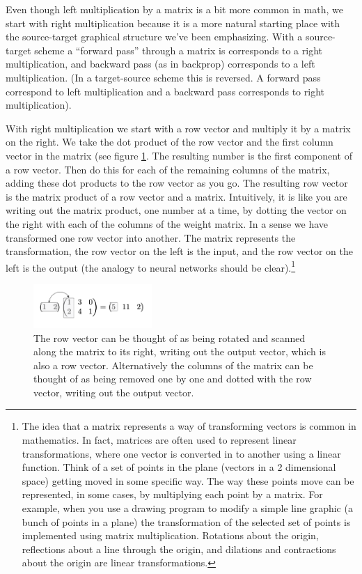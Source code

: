 Even though left multiplication by a matrix is a bit more common in math, we start with right multiplication because it is a more natural starting place with the source-target graphical structure we've been emphasizing.  With a source-target scheme a  ``forward pass'' through a matrix is corresponds to a right multiplication, and backward pass (as in backprop) corresponds to a left multiplication. (In a target-source scheme this is reversed. A forward pass correspond to left multiplication and a backward pass corresponds to right multiplication).

With right multiplication we start with a row vector and multiply it by a matrix on the right. We take the dot product of the row vector and the first column vector in the matrix (see figure \ref{vectorMatrixProduct}. The resulting number is the first component of a row vector. Then do this for each of the remaining columns of the matrix, adding these dot products to the row vector as you go. The resulting row vector is the matrix product of a row vector and a matrix. Intuitively, it is like you are writing out the matrix product, one number at a time, by dotting the vector on the right with each of the columns of the weight matrix.  In a sense we have transformed one row vector into another. The matrix represents the transformation, the row vector on the left is the input, and the row vector on the left is the output (the analogy to neural networks should be clear).\footnote{The idea that a matrix represents a way of transforming vectors is common in mathematics. In fact, matrices are often used to represent linear transformations, where one vector is converted in to another using a linear function. Think of a set of points in the plane (vectors in a 2 dimensional space) getting moved in some specific way. The way these points move can be represented, in some cases, by multiplying each point by a matrix. For example, when you use a drawing program to modify a simple line graphic (a bunch of points in a plane) the transformation of the selected set of points is implemented using matrix multiplication. Rotations about the origin, reflections about a line through the origin, and dilations and contractions about the origin are linear transformations.}

\begin{figure}[h]
\centering
\includegraphics[width=0.4\textwidth]{images/vectorMatrixProduct.png}
\caption[Jeff Yoshimi.]{The row vector can be thought of as being rotated and scanned along the matrix to its right, writing out the output vector, which is also a row vector. Alternatively the columns of the matrix can be thought of as being removed one by one and dotted with the row vector, writing out the output vector.}
\label{vectorMatrixProduct}
\end{figure}

